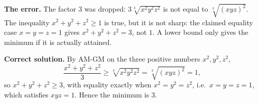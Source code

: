 \textbf{The error.} The factor $3$ was dropped: $3\sqrt[3]{x^2y^2z^2}$ is not equal to $\sqrt[3]{(xyz)^2}$. The inequality $x^2+y^2+z^2\ge1$ is true, but it is not sharp: the claimed equality case $x=y=z=1$ gives $x^2+y^2+z^2=3$, not $1$. A lower bound only gives the minimum if it is actually attained.

\textbf{Correct solution.} By AM-GM on the three positive numbers $x^2,y^2,z^2$,
\[
\dfrac{x^2+y^2+z^2}{3}\ge\sqrt[3]{x^2y^2z^2}=\sqrt[3]{(xyz)^2}=1,
\]
so $x^2+y^2+z^2\ge3$, with equality exactly when $x^2=y^2=z^2$, i.e.\ $x=y=z=1$, which satisfies $xyz=1$. Hence the minimum is $\boxed{3}$.
